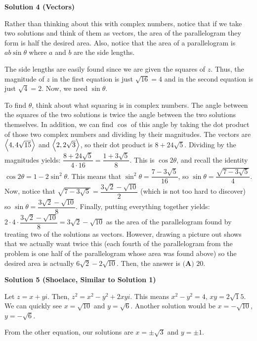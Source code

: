 \begin{enumerate}
\textbf{Solution 4 (Vectors)}

Rather than thinking about this with complex numbers, notice that if we take two solutions and think of them as vectors, the area of the parallelogram they form is half the desired area. Also, notice that the area of a parallelogram is $ab\sin \theta$ where $a$ and $b$ are the side lengths. 

 The side lengths are easily found since we are given the squares of $z$. Thus, the magnitude of $z$ in the first equation is just $\sqrt{16} = 4$ and in the second equation is just $\sqrt{4} = 2$. Now, we need $\sin \theta$. 

 To find $\theta$, think about what squaring is in complex numbers. The angle between the squares of the two solutions is twice the angle between the two solutions themselves. In addition, we can find $\cos$ of this angle by taking the dot product of those two complex numbers and dividing by their magnitudes. The vectors are $\Bigl\langle 4, 4\sqrt{15}\Bigr\rangle$ and $\Bigl\langle 2, 2\sqrt{3}\Bigr\rangle$, so their dot product is $8 + 24\sqrt{5}$. Dividing by the magnitudes yields: $\dfrac{8+24\sqrt{5}}{4 \cdot 16} = \dfrac{1 + 3\sqrt{5}}{8}$. This is $\cos 2\theta$, and recall the identity $\cos 2\theta = 1 - 2\sin^2 \theta$. This means that $\sin^2 \theta = \dfrac{7 - 3\sqrt{5}}{16}$, so $\sin \theta = \dfrac{\sqrt{7-  3\sqrt{5}}}{4}$. Now, notice that $\sqrt{7-  3\sqrt{5}} = \dfrac{3\sqrt{2}-\sqrt{10}}{2}$ (which is not too hard to discover) so $\sin \theta = \dfrac{3\sqrt{2}-\sqrt{10}}{8}$. Finally, putting everything together yields: $2\cdot 4 \cdot \dfrac{3\sqrt{2}-\sqrt{10}}{8} = 3\sqrt{2} - \sqrt{10}$ as the area of the parallelogram found by treating two of the solutions as vectors. However, drawing a picture out shows that we actually want twice this (each fourth of the parallelogram from the problem is one half of the parallelogram whose area was found above) so the desired area is actually $6\sqrt{2} - 2\sqrt{10}$. Then, the answer is $\boxed{\textbf{(A) } 20}$.

 



\textbf{Solution 5 (Shoelace, Similar to Solution 1)}

Let $z = x+yi$. Then, $z^2 = x^2-y^2 + 2xyi$. This means $x^2 - y^2 = 4$, $xy = 2\sqrt15$. We can quickly see $x=\sqrt{10}$ and $y=\sqrt{6}$. Another solution would be $x=-\sqrt{10}$, $y=-\sqrt{6}$.

 From the other equation, our solutions are $x= \pm \sqrt{3}$ and $y = \pm 1$.


\end{enumerate}
